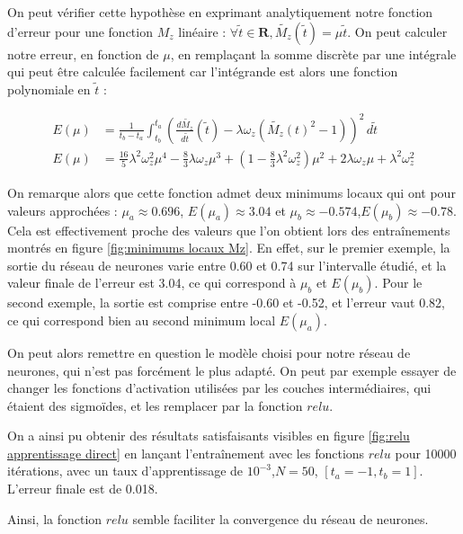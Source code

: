 \documentclass[12pt]{report}
\begin{document}
On peut vérifier cette hypothèse en exprimant analytiquement notre fonction d'erreur pour une fonction $M_z$ linéaire : $\forall \tilde{t} \in \mathbf{R}, \tilde{M_z}(\tilde{t}) = \mu  \tilde{t}$. 
On peut calculer notre erreur, en fonction de $\mu$, en remplaçant la somme discrète par une intégrale qui peut être calculée facilement car 
l'intégrande est alors une fonction polynomiale en $\tilde{t}$ :

\begin{equation}
    \begin{aligned}
        E(\mu) &= \frac{1}{t_b-t_a}\int_{t_b}^{t_a} (\frac{d\tilde{M_z}}{d\tilde{t}}(\tilde{t})-\lambda \omega_z (\tilde{M_z}(t)^2-1))^2 \,d \tilde{t} \\
        E(\mu) &= \frac{16}{5}\lambda^2\omega_z^2\mu^4 
            - \frac{8}{3}\lambda\omega_z\mu^3
            + (1- \frac{8}{3}\lambda^2\omega_z^2)\mu^2
            + 2\lambda\omega_z\mu
            + \lambda^2\omega_z^2
    \end{aligned}
    \label{eq:fonction d'erreur analytique, M_z linéaire}
\end{equation}

On remarque alors que cette fonction admet deux minimums locaux qui ont pour valeurs approchées : $ \mu_a \approx 0.696$, $E(\mu_a) \approx 3.04$ et $\mu_b \approx -0.574$,$ E(\mu_b) \approx -0.78$. 
Cela est effectivement proche des valeurs que l'on obtient lors des entraînements montrés en figure \ref{fig:minimums locaux Mz}.
En effet, sur le premier exemple, la sortie du réseau de neurones varie entre 0.60 et 0.74 sur l'intervalle étudié, et la valeur finale de l'erreur est 3.04, ce qui correspond à $\mu_b$ et $E(\mu_b)$.
Pour le second exemple, la sortie est comprise entre -0.60 et -0.52, et l'erreur vaut 0.82, ce qui correspond bien au second minimum local $E(\mu_a)$.

On peut alors remettre en question le modèle choisi pour notre réseau de neurones, qui n'est pas forcément le plus adapté. 
On peut par exemple essayer de changer les fonctions d'activation utilisées par les couches intermédiaires, qui étaient des sigmoïdes, et les remplacer par la fonction $relu$.

On a ainsi pu obtenir des résultats satisfaisants visibles en figure \ref{fig:relu apprentissage direct} en lançant l'entraînement avec les fonctions $relu$ pour 10000 itérations, avec un taux d'apprentissage de $10^{-3}$,$N=50$, $[t_a = -1, t_b = 1]$.
L'erreur finale est de 0.018.

Ainsi, la fonction $relu$ semble faciliter la convergence du réseau de neurones.
\end{document}
